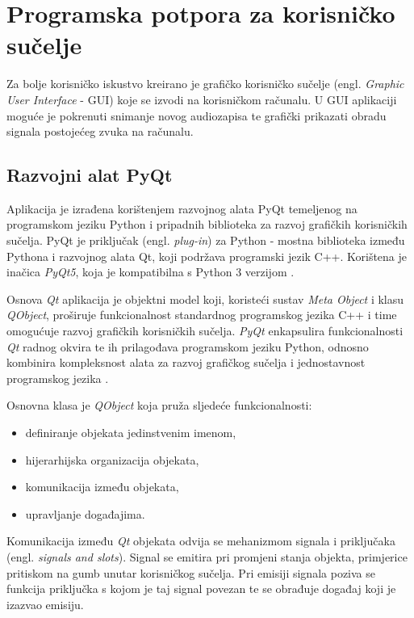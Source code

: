 \chapter{Programska potpora za korisničko sučelje}

Za bolje korisničko iskustvo kreirano je grafičko korisničko sučelje (engl. \textit{Graphic User Interface} - GUI) koje se izvodi na korisničkom računalu. U GUI aplikaciji moguće je pokrenuti snimanje novog audiozapisa te grafički prikazati obradu signala postojećeg zvuka na računalu. 

\section{Razvojni alat PyQt} 
Aplikacija je izrađena korištenjem razvojnog alata PyQt temeljenog na programskom
jeziku Python i pripadnih biblioteka za razvoj grafičkih korisničkih sučelja. PyQt je priključak (engl. \textit{plug-in}) za Python - mostna biblioteka između Pythona i razvojnog alata Qt, koji podržava programski jezik C++. Korištena je inačica \textit{PyQt5}, koja je kompatibilna s Python 3 verzijom \cite{pyqt}. 

Osnova \textit{Qt} aplikacija je objektni model koji, koristeći sustav \textit{Meta Object} i klasu \textit{QObject}, proširuje funkcionalnost standardnog programskog jezika C++ i time omogućuje razvoj grafičkih korisničkih sučelja. \textit{PyQt} enkapsulira funkcionalnosti \textit{Qt} radnog okvira te ih prilagođava programskom jeziku Python, odnosno kombinira kompleksnost alata za razvoj grafičkog sučelja i jednostavnost programskog jezika \cite{qt}. 

Osnovna klasa je \textit{QObject} koja pruža sljedeće funkcionalnosti:
\begin{itemize}
	\item definiranje objekata jedinstvenim imenom,
	\item hijerarhijska organizacija objekata,
	\item komunikacija između objekata, 
	\item upravljanje događajima.
\end{itemize}

Komunikacija između \textit{Qt} objekata odvija se mehanizmom signala i priključaka (engl. \textit{signals and slots}). Signal se emitira pri promjeni stanja objekta, primjerice pritiskom na gumb unutar korisničkog sučelja. Pri emisiji signala poziva se funkcija priključka s kojom je taj signal povezan te se obrađuje događaj koji je izazvao emisiju. 

